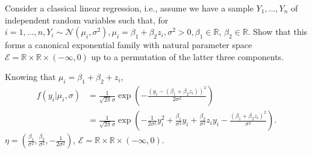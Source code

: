 \begin{ex}
	Consider a classical linear regression, i.e., assume we have a sample \(Y_{1}, \ldots, Y_{n}\) of independent random variables such that, for \(i=1, \ldots, n, Y_{i} \sim \mathcal{N}\left(\mu_{i}, \sigma^{2}\right), \mu_{i}=\beta_{1}+\beta_{2} z_{i}, \sigma^{2}>0, \beta_{1} \in \mathbb{R}\), \(\beta_{2} \in \mathbb{R}\). Show that this forms a canonical exponential family with natural parameter space \(\mathcal{E}=\mathbb{R} \times \mathbb{R} \times(-\infty, 0)\) up to a permutation of the latter three components.
\end{ex}

\begin{solution}
	Knowing that $\mu_i=\beta_1+\beta_2+z_i$,
	\begin{align*}
		f(y_i|\mu_i,\sigma)&=\frac{1}{\sqrt{2\pi}\sigma}\exp\left(-\frac{(y_i-(\beta_1+\beta_2z_i))^2}{2\sigma^2}\right)\\
		&=\frac{1}{\sqrt{2\pi}\sigma}\exp\left(-\frac{1}{2\sigma^2}y_i^2+\frac{\beta_1}{\sigma^2}y_i+\frac{\beta_2}{\sigma^2}z_iy_i-\frac{(\beta_1+\beta_2z_i)^2}{\sigma^2}\right).
	\end{align*}
	$\eta=(\frac{\beta_1}{\sigma^2}, \frac{\beta_2}{\sigma^2}, -\frac{1}{2\sigma^2})$, $\mathcal{E}=\mathbb{R}\times\mathbb{R}\times(-\infty,0)$.
\end{solution}